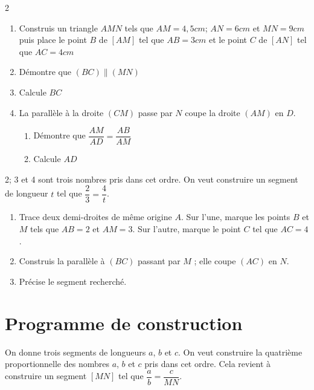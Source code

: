 \begin{multicols}{2}
  	
  	\begin{enumerate}
  		\item  Construis un  triangle $AMN$ tels que $AM=4,5 cm$; $AN=6cm$ et $MN=9cm$ puis place le point $B$ de $[AM]$ tel que $AB=3 cm$ et le point $C$ de $[AN]$ tel que $AC=4 cm$
  		\item Démontre que $(BC) \parallel (MN)$ 
  		\item Calcule $BC$
  		\item La parallèle à la droite $(CM)$  passe par $N$ coupe la droite $(AM)$ en $D$.
  		\begin{enumerate} 
  			\item Démontre que $\dfrac{AM}{AD}=\dfrac{AB}{AM}$
  			\item  Calcule $AD$	
  		\end{enumerate}
  	\end{enumerate}
  	\dures
   	
  	2; 3  et 4 sont trois nombres pris dans cet ordre. On veut construire un segment de longueur $t$ tel que $\dfrac{2}{3}=\dfrac{4}{t}$.
  	\begin{enumerate} 
  		\item Trace deux demi-droites de même origine $A$.  Sur 
  		l’une, marque les points $B$ et $M$ tels que $AB=2$ et $AM=3$. Sur l’autre, marque le point $C$  tel que $AC=4$. 
  		\item Construis la parallèle à $(BC)$ passant par $M$
  		; elle coupe $(AC)$ en $N$. 
  		\item  Précise le segment recherché.	
  	\end{enumerate}
  	\dures
  	\section*{Programme de construction}
  	On donne trois segments de longueurs $a$, $b$ et $c$. On veut construire la quatrième proportionnelle des nombres $a$, $b$ et $c$ pris dans cet ordre. Cela revient à construire un segment $[MN]$ tel que	$\dfrac{a}{b}=\dfrac{c}{MN}$.
  	

\end{multicols}
